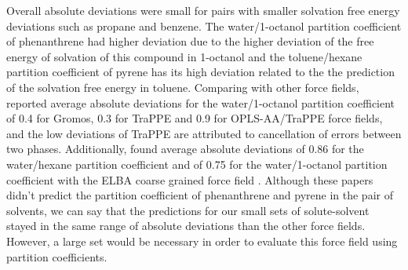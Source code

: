 Overall absolute deviations were small for pairs with smaller solvation free energy deviations such as propane and benzene. The water/1-octanol partition coefficient of phenanthrene had higher deviation due to the higher deviation of the free energy of solvation of this compound in 1-octanol and the toluene/hexane partition coefficient of pyrene has its high deviation related to the the prediction of the solvation free energy in toluene. Comparing with other force fields,  reported average absolute deviations for the water/1-octanol partition coefficient of 0.4 for Gromos, 0.3 for TraPPE and 0.9 for OPLS-AA/TraPPE force fields, and the low deviations of TraPPE are attributed to cancellation of errors between two phases. Additionally,  found average absolute deviations of 0.86 for the water/hexane partition coefficient and of 0.75 for the water/1-octanol partition coefficient with the ELBA coarse grained force field . Although these papers didn't predict the partition coefficient of phenanthrene and pyrene  in the pair of solvents, we can say that the predictions for our small sets of solute-solvent stayed in the same range of absolute deviations than the other force fields. However, a large set would be necessary in order to evaluate this force field using partition coefficients. 